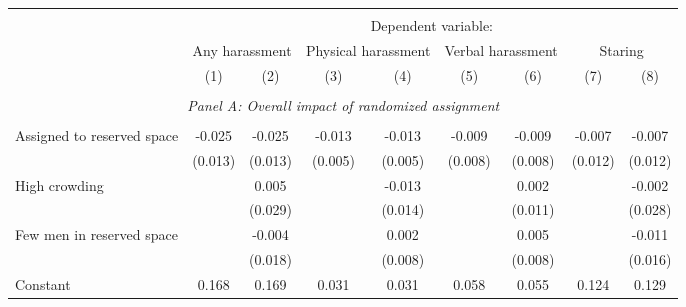 \begin{tabular}{l*{8}{c}} \hline\hline \\[-1.8ex] & \multicolumn{8}{c}{Dependent variable: } \\ 
                    &\multicolumn{2}{c}{Any harassment}         &\multicolumn{2}{c}{Physical harassment}    &\multicolumn{2}{c}{Verbal harassment}      &\multicolumn{2}{c}{Staring}                \\\cmidrule(lr){2-3}\cmidrule(lr){4-5}\cmidrule(lr){6-7}\cmidrule(lr){8-9}
                    &\multicolumn{1}{c}{(1)}         &\multicolumn{1}{c}{(2)}         &\multicolumn{1}{c}{(3)}         &\multicolumn{1}{c}{(4)}         &\multicolumn{1}{c}{(5)}         &\multicolumn{1}{c}{(6)}         &\multicolumn{1}{c}{(7)}         &\multicolumn{1}{c}{(8)}         \\
 \hline \\[-1ex] \multicolumn{9}{c}{\textit{Panel A: Overall impact of randomized assignment}} \\\\[-1ex]
Assigned to reserved space&      -0.025\sym{*}  &      -0.025\sym{*}  &      -0.013\sym{***}&      -0.013\sym{***}&      -0.009         &      -0.009         &      -0.007         &      -0.007         \\
                    &     (0.013)         &     (0.013)         &     (0.005)         &     (0.005)         &     (0.008)         &     (0.008)         &     (0.012)         &     (0.012)         \\
[1em]
High crowding       &                     &       0.005         &                     &      -0.013         &                     &       0.002         &                     &      -0.002         \\
                    &                     &     (0.029)         &                     &     (0.014)         &                     &     (0.011)         &                     &     (0.028)         \\
[1em]
Few men in reserved space&                     &      -0.004         &                     &       0.002         &                     &       0.005         &                     &      -0.011         \\
                    &                     &     (0.018)         &                     &     (0.008)         &                     &     (0.008)         &                     &     (0.016)         \\
[1em]
Constant            &       0.168\sym{***}&       0.169\sym{***}&       0.031\sym{***}&       0.031\sym{***}&       0.058\sym{***}&       0.055\sym{***}&       0.124\sym{***}&       0.129\sym{***}\\

\end{tabular}
